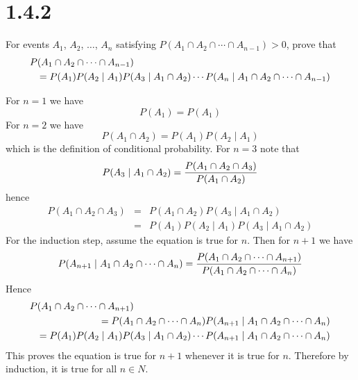 \section*{1.4.2}
For events $A_1$, $A_2$, $\ldots$, $A_n$ satisfying
$P(A_1\cap A_2\cap\cdots\cap A_{n-1})>0$,
prove that
\begin{eqnarray*}
\lefteqn{P(A_1\cap A_2\cap\cdots\cap A_{n-1})}\\
&&=P(A_1)P(A_2\mid A_1)P(A_3\mid A_1\cap A_2)\cdots
P(A_n\mid A_1\cap A_2\cap\cdots\cap A_{n-1})
\end{eqnarray*}

\bigskip
\noindent
For $n=1$ we have
$$P(A_1)=P(A_1)$$
For $n=2$ we have
$$P(A_1\cap A_2)=P(A_1)P(A_2\mid A_1)$$
which is the definition of conditional probability.
For $n=3$ note that
$$P(A_3\mid A_1\cap A_2)={P(A_1\cap A_2\cap A_3)\over P(A_1\cap A_2)}$$
hence
\begin{eqnarray*}
P(A_1\cap A_2\cap A_3)&=&P(A_1\cap A_2)P(A_3\mid A_1\cap A_2)\\
&=&P(A_1)P(A_2\mid A_1)P(A_3\mid A_1\cap A_2)
\end{eqnarray*}
For the induction step, assume the equation is true for $n$.
Then for $n+1$ we have
$$P(A_{n+1}\mid A_1\cap A_2\cap\cdots\cap A_n)=
{P(A_1\cap A_2\cap\cdots\cap A_{n+1})\over
P(A_1\cap A_2\cap\cdots\cap A_n)}$$
Hence
\begin{eqnarray*}
\lefteqn{P(A_1\cap A_2\cap\cdots\cap A_{n+1})}\\
&&=
P(A_1\cap A_2\cap\cdots\cap A_n)
P(A_{n+1}\mid A_1\cap A_2\cap\cdots\cap A_n)\\
&&=P(A_1)P(A_2\mid A_1)P(A_3\mid A_1\cap A_2)\cdots
P(A_{n+1}\mid A_1\cap A_2\cap\cdots\cap A_n)
\end{eqnarray*}
This proves the equation is true for $n+1$ whenever it is true for
$n$.
Therefore by induction, it is true for all $n\in N$.

